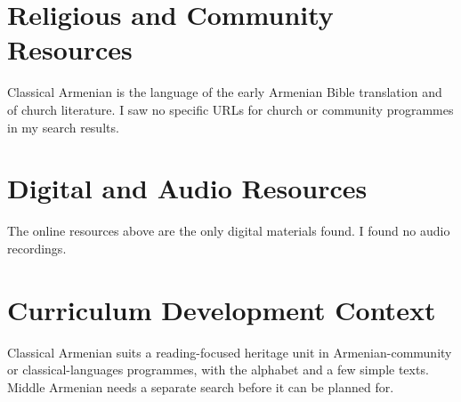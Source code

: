 \documentclass[12pt]{article}
\begin{document}
\section{Religious and Community Resources}
Classical Armenian is the language of the early Armenian Bible translation and of church literature. I saw no specific URLs for church or community programmes in my search results.

\section{Digital and Audio Resources}
The online resources above are the only digital materials found. I found no audio recordings.

\section{Curriculum Development Context}
Classical Armenian suits a reading-focused heritage unit in Armenian-community or classical-languages programmes, with the alphabet and a few simple texts. Middle Armenian needs a separate search before it can be planned for.
\end{document}

